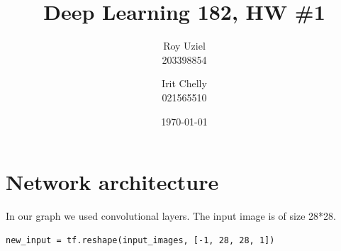 \documentclass[12pt]{article}
\begin{document}
\title{Deep Learning 182, HW \#1}
\author{
Roy Uziel\\
203398854
\and Irit Chelly\\
021565510
}
\date{\today}
\maketitle


\section{Network architecture}
In our graph we used convolutional layers.
The input image is of size 28*28.
\begin{lstlisting}[style=PyStyle]
new_input = tf.reshape(input_images, [-1, 28, 28, 1])   
\end{lstlisting}
\end{document}
